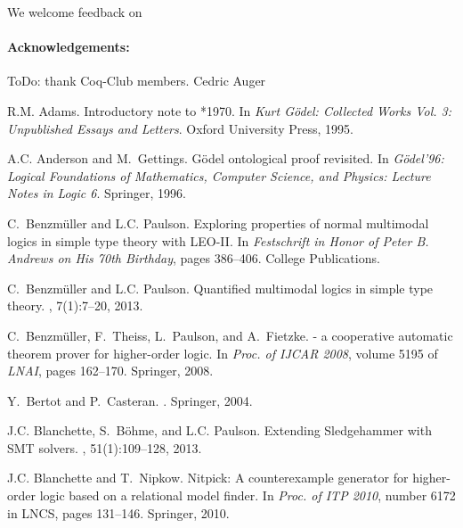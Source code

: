 \documentclass{llncs}
\begin{document}
We welcome feedback on 

\paragraph{Acknowledgements:} ToDo: thank Coq-Club members. Cedric Auger


%
\begin{thebibliography}{10}

R.M. Adams.
\newblock Introductory note to *1970.
\newblock In {\em {Kurt G\"odel: Collected Works Vol. 3: Unpublished Essays and
  Letters}}. Oxford University Press, 1995.

A.C. Anderson and M.~Gettings.
\newblock G\"odel ontological proof revisited.
\newblock In {\em {G\"odel'96: Logical Foundations of Mathematics, Computer
  Science, and Physics: Lecture Notes in Logic 6}}. {Springer}, 1996.

C.~Benzm{\"u}ller and L.C. Paulson.
\newblock Exploring properties of normal multimodal logics in simple type
  theory with {LEO-II}.
\newblock In {\em {Festschrift in Honor of {Peter B. Andrews} on His 70th
  Birthday}}, pages 386--406. College Publications.

C.~Benzm{\"u}ller and L.C. Paulson.
\newblock Quantified multimodal logics in simple type theory.
,
  7(1):7--20, 2013.

C.~Benzm{\"u}ller, F.~Theiss, L.~Paulson, and A.~Fietzke.
 - a cooperative automatic theorem prover for higher-order
  logic.
\newblock In {\em Proc. of IJCAR 2008}, volume 5195 of {\em LNAI}, pages
  162--170. Springer, 2008.

Y.~Bertot and P.~Casteran.
.
\newblock Springer, 2004.

J.C. Blanchette, S.~B\"ohme, and L.C. Paulson.
\newblock Extending {Sledgehammer} with {SMT} solvers.
, 51(1):109--128, 2013.

J.C. Blanchette and T.~Nipkow.
\newblock Nitpick: A counterexample generator for higher-order logic based on a
  relational model finder.
\newblock In {\em Proc. of ITP 2010}, number 6172 in LNCS, pages 131--146.
  Springer, 2010.


\end{thebibliography}
\end{document}
